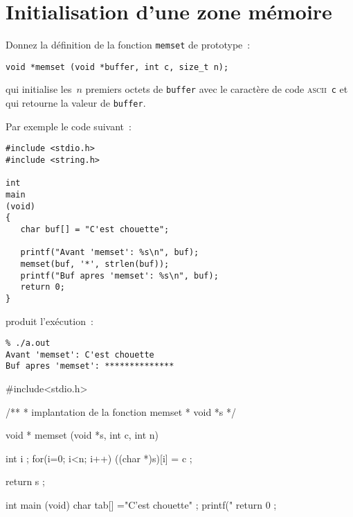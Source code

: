 \section{Initialisation d'une zone m{\'e}moire}
Donnez la d\'efinition de la fonction \verb+memset+ de prototype~:
\begin{verbatim}
void *memset (void *buffer, int c, size_t n);
\end{verbatim}
qui initialise les~$n$ premiers octets de \verb+buffer+ avec le caract\`ere de code \textsc{ascii}~\verb+c+ et 
qui retourne la valeur de \verb+buffer+.
\par\medskip
Par exemple le code suivant~:
\begin{verbatim}
#include <stdio.h>
#include <string.h>

int 
main
(void) 
{
   char buf[] = "C'est chouette";

   printf("Avant 'memset': %s\n", buf);
   memset(buf, '*', strlen(buf));
   printf("Buf apres 'memset': %s\n", buf);
   return 0;
}
\end{verbatim}
produit l'ex\'ecution~:
\begin{verbatim}
% ./a.out
Avant 'memset': C'est chouette
Buf apres 'memset': **************
\end{verbatim}
\begin{correction}
#include<stdio.h>

/**
* \brief implantation de la fonction memset
* \parameter void *s 
*/

void *
memset
(void *s, int c, int n)
{
	int i ;
	for(i=0; i<n; i++)
	  ((char *)s)[i] = c ;

	return s ;
}

int
main
(void)
{
	char tab[] ="C'est chouette" ;
	printf("%
	return 0 ;
}
\end{correction}
